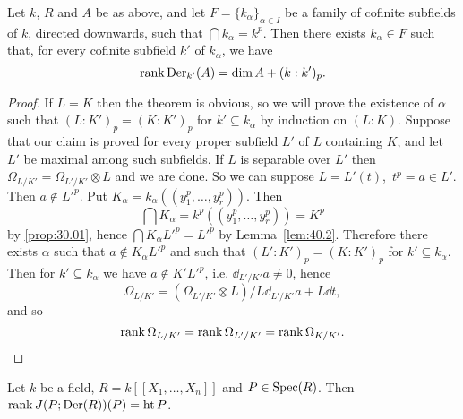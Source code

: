 \documentclass[../main]{subfiles}
\begin{document}
\begin{theorem}\label{thm:096}
Let $k$, $R$ and $A$ be as above, and let $F = \{k_\alpha\}_{\alpha \in I}$ be a family of cofinite subfields of $k$, directed downwards, such that $\bigcap k_\alpha = k^p$. Then there exists $k_\alpha \in F$ such that, for every cofinite subfield $k'$ of $k_\alpha$, we have
\[
\operatorname{rank} \operatorname{Der}_{k'}(A) = \operatorname{dim} A + (k : k')_p.
\]
\end{theorem}

\begin{proof}
If $L = K$ then the theorem is obvious, so we will prove the existence of $\alpha$ such that $(L : K')_p = (K : K')_p$ for $k' \subseteq k_\alpha$ by induction on $(L : K)$. Suppose that our claim is proved for every proper subfield $L'$ of $L$ containing $K$, and let $L'$ be maximal among such subfields. If $L$ is separable over $L'$ then\newline $\Omega_{L/K'} = \Omega_{L'/K'} \otimes L$ and we are done. So we can suppose $L = L'(t)$, $\, t^p = a \in L'$. Then $a \not \in {L'}^p$. Put $K_\alpha = k_\alpha((y_1^p, \ldots, y_r^p))$. Then \[\bigcap K_\alpha = k^p((y_1^p, \ldots, y_r^p)) = K^p\] by \ref{prop:30.01}, hence $\bigcap K_\alpha {L'}^p = {L'}^p$ by Lemma~\ref{lem:40.2}. Therefore there exists $\alpha$ such that $a \not \in K_\alpha {L'}^p$ and such that $(L' : K')_p = (K : K')_p$ for $k' \subseteq k_\alpha$. Then for $k' \subseteq k_\alpha$ we have $a \not \in K' {L'}^p$, i.e. $\dd_{L'/K'} a \ne 0$, hence \[\Omega_{L/K'} = (\Omega_{L'/K'} \otimes L)/L \dd_{L'/K'} a + L \dd t,\] and so \[\operatorname{rank} \Omega_{L/K'} = \operatorname{rank} \Omega_{L'/K'} = \operatorname{rank} \Omega_{K/K'}.\]
\end{proof}

\begin{theorem}[Nagata]\label{thm:097}
Let $k$ be a field, $R = k[[X_1, \ldots, X_n]]$ and $P \in \operatorname{Spec}(R)$. Then $\operatorname{rank} J(P; \operatorname{Der}(R))(P) = \operatorname{ht} P$.
\end{theorem}
\end{document}
